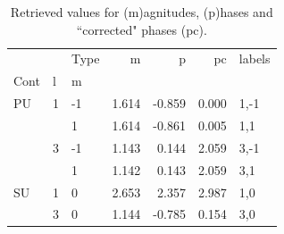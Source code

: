 \documentclass[10pt]{article}
\begin{document}
\begin{table}
\centering
\begin{tabular}{lllrrrl}
\toprule
   &   & Type &     m &      p &    pc & labels \\
Cont & l & m &       &        &       &        \\
\midrule
PU & 1 & -1 & 1.614 & -0.859 & 0.000 &   1,-1 \\
   &   &  1 & 1.614 & -0.861 & 0.005 &    1,1 \\
   & 3 & -1 & 1.143 &  0.144 & 2.059 &   3,-1 \\
   &   &  1 & 1.142 &  0.143 & 2.059 &    3,1 \\
SU & 1 &  0 & 2.653 &  2.357 & 2.987 &    1,0 \\
   & 3 &  0 & 1.144 & -0.785 & 0.154 &    3,0 \\
\bottomrule
\end{tabular}

\caption{{\label{tab:aggMatE}Retrieved values for (m)agnitudes, (p)hases and ``corrected" phases (pc).}}
\end{table}
\end{document}
